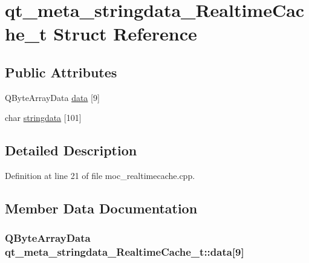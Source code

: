 \hypertarget{structqt__meta__stringdata___realtime_cache__t}{}\section{qt\+\_\+meta\+\_\+stringdata\+\_\+\+Realtime\+Cache\+\_\+t Struct Reference}
\label{structqt__meta__stringdata___realtime_cache__t}
\subsection*{Public Attributes}
\begin{DoxyCompactItemize}
\item 
Q\+Byte\+Array\+Data \hyperlink{structqt__meta__stringdata___realtime_cache__t_a912998a1943b82af9a79a428575a3338}{data} \mbox{[}9\mbox{]}
\item 
char \hyperlink{structqt__meta__stringdata___realtime_cache__t_a5b3b2b4c42b48962e7b06d871ca66ef4}{stringdata} \mbox{[}101\mbox{]}
\end{DoxyCompactItemize}


\subsection{Detailed Description}


Definition at line 21 of file moc\+\_\+realtimecache.\+cpp.



\subsection{Member Data Documentation}
\hypertarget{structqt__meta__stringdata___realtime_cache__t_a912998a1943b82af9a79a428575a3338}{}
\subsubsection[{data}]{\setlength{\rightskip}{0pt plus 5cm}Q\+Byte\+Array\+Data qt\+\_\+meta\+\_\+stringdata\+\_\+\+Realtime\+Cache\+\_\+t\+::data\mbox{[}9\mbox{]}}\label{structqt__meta__stringdata___realtime_cache__t_a912998a1943b82af9a79a428575a3338}


